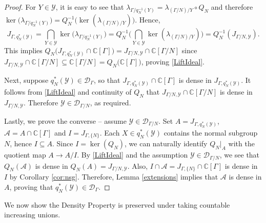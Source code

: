 \documentclass[11pt, oneside, reqno]{amsart}
\theoremstyle{definition}
\theoremstyle{remark}
\numberwithin{equation}{section}
\begin{document}
\begin{proof}
    For $Y \in \mathcal{Y}$, it is easy to see that $\lambda_{\Gamma/q_{N}^{-1}(Y)} = \lambda_{(\Gamma/N)/Y}\circ Q_{N}$ and therefore $\ker\big(\lambda_{\Gamma/q_{N}^{-1}(Y)}\big) = Q_{N}^{-1}\big(\ker(\lambda_{(\Gamma/N)/Y})\big)$. Hence,
    \[
    J_{\Gamma, q^{*}_{N}(\mathcal{Y})} = \bigcap_{Y \in \mathcal{Y}} \ker\big(\lambda_{\Gamma/q_{N}^{-1}(Y)}\big) = Q^{-1}_{N}\big(\bigcap_{Y \in \mathcal{Y}}\ker(\lambda_{(\Gamma/N)/Y})\big) = Q^{-1}_{N}(J_{\Gamma/N,\mathcal{Y}}).
    \]
    This implies $Q_{N}\big(J_{\Gamma, q_{N}^{*}(\mathcal{Y})} \cap \mathbb{C}[\Gamma] \big) = J_{\Gamma/N,\mathcal{Y}}\cap\mathbb{C}[\Gamma/N]$ since $ J_{\Gamma/N,\mathcal{Y}}\cap\mathbb{C}[\Gamma/N]\subseteq \mathbb{C}[\Gamma/N] = Q_{N}\big(\mathbb{C}[\Gamma]\big)$, proving \eqref{LiftIdeal}.
    
    Next, suppose $q_{N}^{*}(\mathcal{Y})\in\mathcal{D}_{\Gamma}$, so that $J_{\Gamma,q^{*}_{N}(\mathcal{Y})} \cap \mathbb{C}[\Gamma]$ is dense in $J_{\Gamma,q^{*}_{N}(\mathcal{Y})}$. It follows from \eqref{LiftIdeal} and continuity of $Q_N$ that $J_{\Gamma/N, \mathcal{Y}}\cap \mathbb{C}[\Gamma/N]$ is dense in $J_{\Gamma/N, \mathcal{Y}}$. Therefore $\mathcal{Y}\in\mathcal{D}_{\Gamma/N}$, as required.

    Lastly, we prove the converse -- assume $\mathcal{Y}\in\mathcal{D}_{\Gamma/N}$. Set $A = J_{\Gamma, q^{*}_{N}(\mathcal{Y})}$, $\mathcal{A} = A\cap\mathbb{C}[\Gamma]$ and $I = J_{\Gamma, \{N\}}$. Each $X\in q_{N}^{*}(\mathcal{Y})$ contains the normal subgroup $N$, hence $I\subseteq A$. Since $I = \ker(Q_{N})$, we can naturally identify $Q_N|_A$ with the quotient map $A \to A/I$. By \eqref{LiftIdeal} and the assumption $\mathcal{Y}\in\mathcal{D}_{\Gamma/N}$, we see that $Q_N(\mathcal{A})$ is dense in $Q_N(A) = J_{\Gamma/N,\mathcal{Y}}$. Also, $I\cap\mathcal{A} = J_{\Gamma, \{N\}}\cap\mathbb{C}[\Gamma]$ is dense in $I$ by Corollary \ref{cor:nsg}. Therefore, Lemma \ref{extensions} implies that $\mathcal{A}$ is dense in $A$, proving that $q_{N}^{*}(\mathcal{Y})\in \mathcal{D}_{\Gamma}$.
\end{proof}

We now show the Density Property is preserved under taking countable increasing unions.
\end{document}
